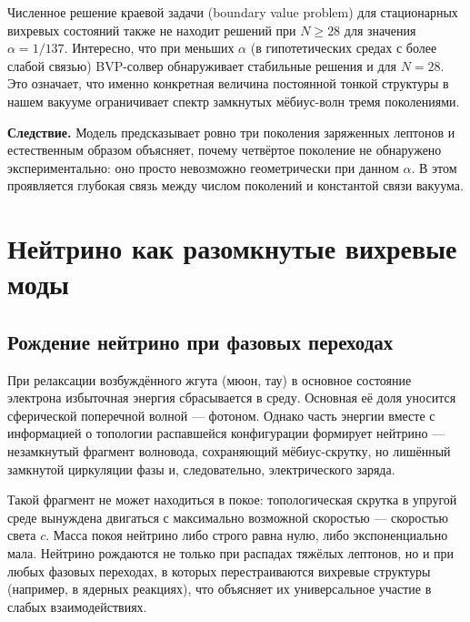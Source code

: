 \documentclass[12pt,a4paper]{article}
\begin{document}
Численное решение краевой задачи (boundary value problem) для стационарных вихревых состояний также не находит решений при $N \ge 28$ для значения $\alpha = 1/137$. Интересно, что при меньших $\alpha$ (в гипотетических средах с более слабой связью) BVP-солвер обнаруживает стабильные решения и для $N=28$. Это означает, что именно конкретная величина постоянной тонкой структуры в нашем вакууме ограничивает спектр замкнутых мёбиус-волн тремя поколениями.

\textbf{Следствие.} Модель предсказывает ровно три поколения заряженных лептонов и естественным образом объясняет, почему четвёртое поколение не обнаружено экспериментально: оно просто невозможно геометрически при данном $\alpha$. В этом проявляется глубокая связь между числом поколений и константой связи вакуума.

\section{Нейтрино как разомкнутые вихревые моды}

\subsection{Рождение нейтрино при фазовых переходах}
При релаксации возбуждённого жгута (мюон, тау) в основное состояние электрона избыточная энергия сбрасывается в среду. Основная её доля уносится сферической поперечной волной — фотоном. Однако часть энергии вместе с информацией о топологии распавшейся конфигурации формирует нейтрино — незамкнутый фрагмент волновода, сохраняющий мёбиус-скрутку, но лишённый замкнутой циркуляции фазы и, следовательно, электрического заряда.

Такой фрагмент не может находиться в покое: топологическая скрутка в упругой среде вынуждена двигаться с максимально возможной скоростью — скоростью света $c$. Масса покоя нейтрино либо строго равна нулю, либо экспоненциально мала. Нейтрино рождаются не только при распадах тяжёлых лептонов, но и при любых фазовых переходах, в которых перестраиваются вихревые структуры (например, в ядерных реакциях), что объясняет их универсальное участие в слабых взаимодействиях.
\end{document}
